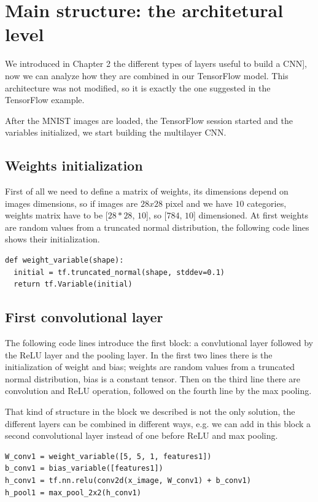 \section{Main structure: the architetural level}

We introduced in Chapter 2 the different types of layers useful to build a \acs{CNN}], now we can analyze how they are combined in our TensorFlow model. This architecture was not modified, so it is exactly the one suggested in the TensorFlow example.

After the MNIST images are loaded, the TensorFlow session started and the variables initialized, we start building the multilayer \acs{CNN}.

\subsection{Weights initialization}

First of all we need to define a matrix of weights, its dimensions depend on images dimensions, so if images are $28x28$ pixel and we have $10$ categories, weights matrix have to be [$28*28$, $10$], so [$784$, $10$] dimensioned. At first weights are random values from a truncated normal distribution, the following code lines shows their initialization.

\begin{lstlisting}
def weight_variable(shape):
  initial = tf.truncated_normal(shape, stddev=0.1)
  return tf.Variable(initial)
\end{lstlisting}

\subsection{First convolutional layer}

The following code lines introduce the first block: a convlutional layer followed by the ReLU layer and the pooling layer. In the first two lines there is the initialization of weight and bias; weights are random values from a truncated normal distribution, bias is a constant tensor. Then on the third line there are convolution and ReLU operation, followed on the fourth line by the max pooling.

That kind of structure in the block we described is not the only solution, the different layers can be combined in different ways, e.g. we can add in this block a second convolutional layer instead of one before ReLU and max pooling.

\begin{lstlisting}
W_conv1 = weight_variable([5, 5, 1, features1])
b_conv1 = bias_variable([features1])
h_conv1 = tf.nn.relu(conv2d(x_image, W_conv1) + b_conv1)
h_pool1 = max_pool_2x2(h_conv1)
\end{lstlisting}


